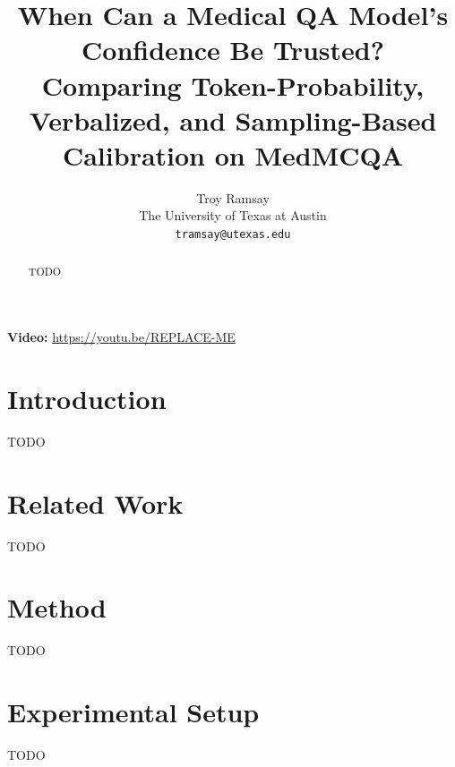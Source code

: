 \documentclass{article}
\title{When Can a Medical QA Model's Confidence Be Trusted?\\
Comparing Token-Probability, Verbalized, and Sampling-Based Calibration on MedMCQA}
\author{Troy Ramsay \\ The University of Texas at Austin \\ \texttt{tramsay@utexas.edu}}
\begin{document}
\maketitle

\begin{center}
  \textbf{Video:} \url{https://youtu.be/REPLACE-ME}
\end{center}

\begin{abstract}
TODO
\end{abstract}

\section{Introduction}
TODO

\section{Related Work}
TODO

\section{Method}
TODO

\section{Experimental Setup}
TODO
\end{document}
